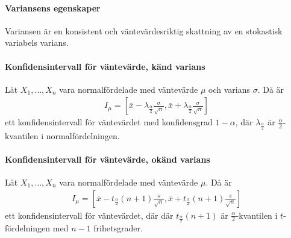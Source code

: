 \proof

\paragraph{Variansens egenskaper}
Variansen är en konsistent och väntevärdesriktig skattning av en stokastisk variabels varians.

\proof

\paragraph{Konfidensintervall för väntevärde, känd varians}
Låt $X_1, \dots, X_{n}$ vara normalfördelade med väntevärde $\mu$ och varians $\sigma$. Då är
\begin{align*}
	I_{\mu} = \left[\bar{x} - \lambda_{\frac{\alpha}{2}}\frac{\sigma}{\sqrt{n}}, \bar{x} + \lambda_{\frac{\alpha}{2}}\frac{\sigma}{\sqrt{n}}\right]
\end{align*}
ett konfidensintervall för väntevärdet med konfidensgrad $1 - \alpha$, där $\lambda_{\frac{\alpha}{2}}$ är $\frac{\alpha}{2}$-kvantilen i normalfördelningen.

\proof

\paragraph{Konfidensintervall för väntevärde, okänd varians}
Låt $X_1, \dots, X_{n}$ vara normalfördelade med väntevärde $\mu$. Då är
\begin{align*}
	I_{\mu} = \left[\bar{x} - t_{\frac{\alpha}{2}}(n + 1)\frac{s}{\sqrt{n}}, \bar{x} + t_{\frac{\alpha}{2}}(n + 1)\frac{s}{\sqrt{n}}\right]
\end{align*}
ett konfidensintervall för väntevärdet, där där $t_{\frac{\alpha}{2}}(n + 1)$ är $\frac{\alpha}{2}$-kvantilen i $t$-fördelningen med $n - 1$ frihetsgrader.

\proof